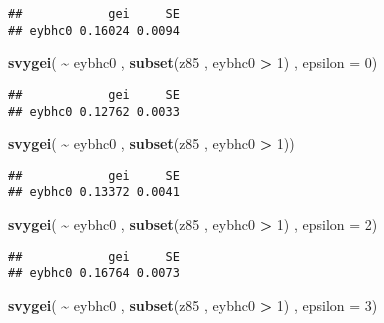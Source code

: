 \documentclass[
]{book}
\newenvironment{Shaded}{\begin{snugshade}}{\end{snugshade}}
\newcommand{\AttributeTok}[1]{\textcolor[rgb]{0.13,0.29,0.53}{#1}}
\newcommand{\DecValTok}[1]{\textcolor[rgb]{0.00,0.00,0.81}{#1}}
\newcommand{\FunctionTok}[1]{\textcolor[rgb]{0.13,0.29,0.53}{\textbf{#1}}}
\newcommand{\NormalTok}[1]{#1}
\newcommand{\SpecialCharTok}[1]{\textcolor[rgb]{0.81,0.36,0.00}{\textbf{#1}}}
\begin{document}
\begin{verbatim}
##            gei     SE
## eybhc0 0.16024 0.0094
\end{verbatim}

\begin{Shaded}
\begin{Highlighting}[]
\FunctionTok{svygei}\NormalTok{( }\SpecialCharTok{\textasciitilde{}}\NormalTok{ eybhc0 , }\FunctionTok{subset}\NormalTok{(z85 , eybhc0 }\SpecialCharTok{\textgreater{}} \DecValTok{1}\NormalTok{) , }\AttributeTok{epsilon =} \DecValTok{0}\NormalTok{)}
\end{Highlighting}
\end{Shaded}

\begin{verbatim}
##            gei     SE
## eybhc0 0.12762 0.0033
\end{verbatim}

\begin{Shaded}
\begin{Highlighting}[]
\FunctionTok{svygei}\NormalTok{( }\SpecialCharTok{\textasciitilde{}}\NormalTok{ eybhc0 , }\FunctionTok{subset}\NormalTok{(z85 , eybhc0 }\SpecialCharTok{\textgreater{}} \DecValTok{1}\NormalTok{))}
\end{Highlighting}
\end{Shaded}

\begin{verbatim}
##            gei     SE
## eybhc0 0.13372 0.0041
\end{verbatim}

\begin{Shaded}
\begin{Highlighting}[]
\FunctionTok{svygei}\NormalTok{( }\SpecialCharTok{\textasciitilde{}}\NormalTok{ eybhc0 , }\FunctionTok{subset}\NormalTok{(z85 , eybhc0 }\SpecialCharTok{\textgreater{}} \DecValTok{1}\NormalTok{) , }\AttributeTok{epsilon =} \DecValTok{2}\NormalTok{)}
\end{Highlighting}
\end{Shaded}

\begin{verbatim}
##            gei     SE
## eybhc0 0.16764 0.0073
\end{verbatim}

\begin{Shaded}
\begin{Highlighting}[]
\FunctionTok{svygei}\NormalTok{( }\SpecialCharTok{\textasciitilde{}}\NormalTok{ eybhc0 , }\FunctionTok{subset}\NormalTok{(z85 , eybhc0 }\SpecialCharTok{\textgreater{}} \DecValTok{1}\NormalTok{) , }\AttributeTok{epsilon =} \DecValTok{3}\NormalTok{)}
\end{Highlighting}
\end{Shaded}
\end{document}
